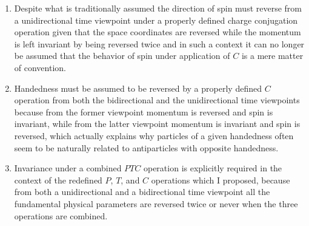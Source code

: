 \documentclass[notitlepage,12pt]{report}
\begin{document}
\begin{enumerate}
\item Despite what is traditionally assumed the direction of spin must reverse from a unidirectional time viewpoint under a properly defined charge conjugation operation given that the space coordinates are reversed while the momentum is left invariant by being reversed twice and in such a context it can no longer be assumed that the behavior of spin under application of $C$ is a mere matter of convention.

\item Handedness must be assumed to be reversed by a properly defined $C$ operation from both the bidirectional and the unidirectional time viewpoints because from the former viewpoint momentum is reversed and spin is invariant, while from the latter viewpoint momentum is invariant and spin is reversed, which actually explains why particles of a given handedness often seem to be naturally related to antiparticles with opposite handedness.

\item Invariance under a combined $PTC$ operation is explicitly required in the context of the redefined $P$, $T$, and $C$ operations which I proposed, because from both a unidirectional and a bidirectional time viewpoint all the fundamental physical parameters are reversed twice or never when the three operations are combined.


\end{enumerate}
\end{document}
